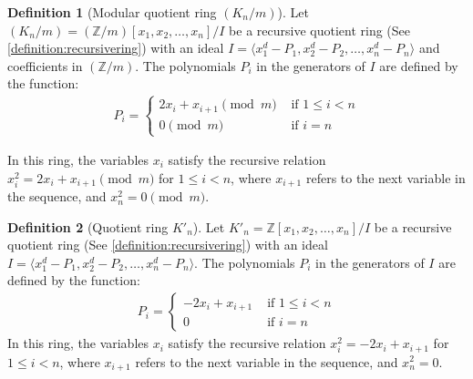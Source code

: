 \documentclass{article}
\theoremstyle{plain}
\theoremstyle{definition}
\newtheorem{definition}{Definition}
\newcommand{\Z}{\mathbb{Z}}
\newcommand{\K}{K}
\begin{document}
\begin{definition}[Modular quotient ring $(\K_n/m)$] \label{definition:modring}
Let $(\K_n/m) = (\Z/m)[x_1, x_2, \ldots, x_n]/I$ be a recursive quotient ring (See \cref{definition:recursivering}) with an ideal \( I = \langle x_1^d - P_1, x_2^d - P_2, \ldots, x_n^d - P_n \rangle \) and coefficients in $(\Z/m)$. The polynomials $P_i$ in the generators of $I$ are defined by the function: 
\begin{align}
P_i =
\begin{cases}
    2x_i + x_{i+1} \pmod{m} & \text{ if } 1 \leq i < n \\
    0 \pmod{m} &\text{ if } i = n
\end{cases}
\end{align}

In this ring, the variables $x_i$ satisfy the recursive relation $x_i^2 = 2x_i + x_{i+1} \pmod{m}$ for $1 \leq i < n$, where $x_{i+1}$ refers to the next variable in the sequence, and $x_n^2 = 0 \pmod{m}$.
\end{definition}

\begin{definition}[Quotient ring $\K'_n$] \label{definition:ring2}
Let $\K'_n = \Z[x_1, x_2, \ldots, x_n]/I$ be a recursive quotient ring (See \cref{definition:recursivering}) with an ideal \( I = \langle x_1^d - P_1, x_2^d - P_2, \ldots, x_n^d - P_n \rangle \). The polynomials $P_i$ in the generators of $I$ are defined by the function: 
\begin{align}
P_i =
\begin{cases}
    -2x_i + x_{i+1} & \text{ if } 1 \leq i < n \\
    0 &\text{ if } i = n
\end{cases}
\end{align}
In this ring, the variables $x_i$ satisfy the recursive relation $x_i^2 = -2x_i + x_{i+1}$ for $1 \leq i < n$, where $x_{i+1}$ refers to the next variable in the sequence, and $x_n^2 = 0$.
\end{definition}
\end{document}

